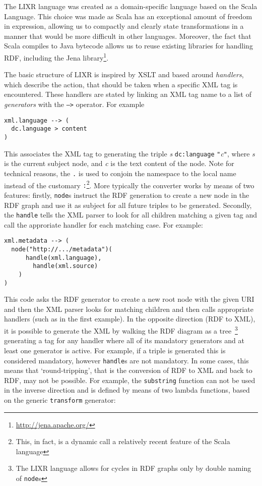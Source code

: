 \documentclass{acm_proc_article-sp}
\begin{document}
The LIXR language was created as a domain-specific language based on the Scala
Language. This choice was made as Scala has an exceptional amount of freedom in
expression, allowing us to compactly and clearly state transformations in a manner
that would be more difficult in other languages. Moreover, the fact that Scala
compiles to Java bytecode allows us to reuse existing libraries for handling
RDF, including the Jena library\footnote{\url{http://jena.apache.org/}}.

The basic structure of LIXR is inspired by XSLT and based around \emph{handlers},
which describe the action, that should be taken when a specific XML tag is 
encountered. These handlers are stated by linking an XML tag name to a list
of \emph{generators} with the {\tt -->} operator. For example

\begin{verbatim}
xml.language --> (
  dc.language > content
)
\end{verbatim}

This associates the XML tag {\tt <xml:language>} to
generating the triple \emph{s} {\tt dc:language} {\tt "}\emph{c}{\tt "}, 
where \emph{s} is the current subject node, and \emph{c} is the text content of
the node. Note for technical reasons, the {\tt .} is used to conjoin the namespace
to the local name instead of the customary {\tt :}\footnote{This, in fact, is 
a dynamic call a relatively recent feature of the Scala language}. More typically
the converter works by means of two features: firstly, {\tt node}s instruct the RDF generation
to create a new node in the RDF graph and use it as subject for all future triples
to be generated. Secondly, the {\tt handle} tells the XML parser to look for all 
children matching a given tag and call the approriate handler for each matching
case. For example:

\begin{verbatim}
xml.metadata --> (
  node("http://.../metadata")(
	  handle(xml.language),
		handle(xml.source)
	)
)
\end{verbatim}

This code asks the RDF generator to create a new root node with the given URI and
then the XML parser looks for matching children and then calls appropriate handlers
(such as in the first example). In the opposite direction (RDF to XML), it is
possible to generate the XML by walking the RDF diagram as a tree~\footnote{
The LIXR language allows for cycles in RDF graphs only by double naming of
{\tt node}s} generating a
tag for any handler where all of its mandatory generators and at least one 
generator is active. For example, if a triple is generated this is considered
mandatory, however {\tt handle}s are not mandatory. In some cases, this means that
`round-tripping', that is the conversion of RDF to XML and back to RDF, may not
be possible. For example, the {\tt substring} function can not be used in the
inverse direction and is defined by means of two lambda functions, based on
the generic {\tt transform} generator:
\end{document}
